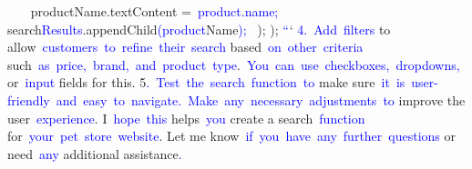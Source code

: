 \documentclass{article}
\begin{document}
\begin{tcolorbox}[colframe=black,colback=white]
{{{}\textcolor{blue}{~~~} productName.textContent =\textcolor{blue}{~product}\textcolor{blue}{.name}\textcolor{blue}{;
}\textcolor{blue}{~~~} search\textcolor{blue}{Results}.appendChild\textcolor{blue}{(product}Name\textcolor{blue}{);
} \textcolor{blue}{~});
}});
\textcolor{blue}{``}`
\textcolor{blue}{4}\textcolor{blue}{.}\textcolor{blue}{~Add}\textcolor{blue}{~filters} to allow\textcolor{blue}{~customers}\textcolor{blue}{~to}\textcolor{blue}{~refine}\textcolor{blue}{~their}\textcolor{blue}{~search} based\textcolor{blue}{~on}\textcolor{blue}{~other}\textcolor{blue}{~criteria} such\textcolor{blue}{~as}\textcolor{blue}{~price}\textcolor{blue}{,}\textcolor{blue}{~brand}\textcolor{blue}{,}\textcolor{blue}{~and}\textcolor{blue}{~product}\textcolor{blue}{~type}.\textcolor{blue}{~You}\textcolor{blue}{~can}\textcolor{blue}{~use}\textcolor{blue}{~checkboxes}\textcolor{blue}{,}\textcolor{blue}{~dropdown}\textcolor{blue}{s}\textcolor{blue}{,} or\textcolor{blue}{~input} fields for this.
5\textcolor{blue}{.}\textcolor{blue}{~Test}\textcolor{blue}{~the}\textcolor{blue}{~search}\textcolor{blue}{~function}\textcolor{blue}{~to} make sure\textcolor{blue}{~it}\textcolor{blue}{~is}\textcolor{blue}{~user}\textcolor{blue}{-friendly}\textcolor{blue}{~and}\textcolor{blue}{~easy}\textcolor{blue}{~to}\textcolor{blue}{~navigate}\textcolor{blue}{.}\textcolor{blue}{~Make}\textcolor{blue}{~any}\textcolor{blue}{~necessary}\textcolor{blue}{~adjustments}\textcolor{blue}{~to} improve the user\textcolor{blue}{~experience}.
I\textcolor{blue}{~hope}\textcolor{blue}{~this} helps\textcolor{blue}{~you} create a search\textcolor{blue}{~function} for\textcolor{blue}{~your}\textcolor{blue}{~pet}\textcolor{blue}{~store}\textcolor{blue}{~website}. Let me know\textcolor{blue}{~if}\textcolor{blue}{~you}\textcolor{blue}{~have}\textcolor{blue}{~any}\textcolor{blue}{~further}\textcolor{blue}{~questions} or need\textcolor{blue}{~any} additional assistance\textcolor{blue}{.}\textcolor{blue}{}
\end{tcolorbox}
\end{document}
